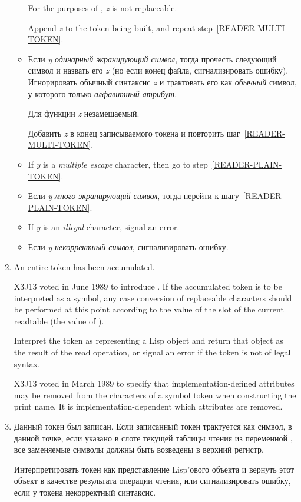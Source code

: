 \begin{enumerate}
\begin{itemize}
For the purposes of , \emph{z} is not replaceable.

Append \emph{z} to the token being built,
and repeat step~\ref{READER-MULTI-TOKEN}.

\item Если \emph{y} \emph{одинарный экранирующий символ}, тогда
  прочесть следующий символ и назвать его \emph{z} (но если конец
  файла, сигнализировать ошибку). Игнорировать обычный синтаксис
  \emph{z} и трактовать его как \emph{обычный} символ, у которого
  только \emph{алфавитный атрибут}.

  Для функции  \emph{z} незамещаемый.

  Добавить \emph{z} в конец записываемого токена и повторить
  шаг~\ref{READER-MULTI-TOKEN}.

\item
If \emph{y} is a \emph{multiple escape} character,
then go to step~\ref{READER-PLAIN-TOKEN}.

\item Если \emph{y} \emph{много экранирующий символ}, тогда перейти к
  шагу~\ref{READER-PLAIN-TOKEN}.

\item
If \emph{y} is an \emph{illegal} character, signal an error.

\item Если \emph{y} \emph{некорректный символ}, сигнализировать ошибку.
\end{itemize}

\item
An entire token has been accumulated.
\begin{newer}
X3J13 voted in June 1989  to introduce
.  If the accumulated token
is to be interpreted as a symbol, any case conversion of replaceable
characters should be performed at this point according to the value
of the  slot of the current readtable (the value
of ).
\end{newer}
Interpret the token as representing
a Lisp object and return that object as the result
of the read operation, or signal an error if the token
is not of legal syntax.
\begin{newer}
X3J13 voted in March 1989 
to specify that implementation-defined
attributes may be removed from the characters of a symbol token
when constructing the print name.
It is implementation-dependent which attributes are removed.
\end{newer}
\label{READER-TOKEN-END}

\item Данный токен был записан.  Если записанный токен трактуется как
  символ, в данной точке, если указано в слоте 
  текущей таблицы чтения из переменной , все
  заменяемые символы должны быть возведены в верхний регистр.

  Интерпретировать токен как представление Lisp'ового объекта и
  вернуть этот объект в качестве результата операции чтения, или
  сигнализировать ошибку, если у токена некорректный синтаксис.
\label{READER-TOKEN-END}

\end{enumerate}
